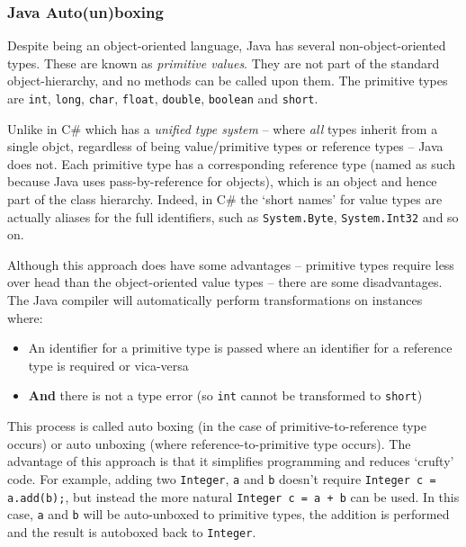 		\subsubsection{Java Auto(un)boxing} \label{sec:runtime/implementation/instrument/boxing}
		Despite being an object-oriented language, Java has several non-object-oriented types. These are known as \textit{primitive values}. They are not part of the standard object-hierarchy, and no methods can be called upon them. The primitive types are \texttt{int}, \texttt{long}, \texttt{char}, \texttt{float}, \texttt{double}, \texttt{boolean} and \texttt{short}.
		
		Unlike in C\# which has a \textit{unified type system} -- where \emph{all} types inherit from a single objct, regardless of being value/primitive types or reference types -- Java does not. Each primitive type has a corresponding reference type (named as such because Java uses pass-by-reference for objects), which is an object and hence part of the class hierarchy. Indeed, in C\# the `short names' for value types are actually aliases for the full identifiers, such as \texttt{System.Byte}, \texttt{System.Int32} and so on.
		
		Although this approach does have some advantages -- primitive types require less over head than the object-oriented value types -- there are some disadvantages. The Java compiler will automatically perform transformations on instances where:
		
		\begin{itemize}
			\item An identifier for a primitive type is passed where an identifier for a reference type is required or vica-versa
			\item \textbf{And} there is not a type error (so \texttt{int} cannot be transformed to \texttt{short})
		\end{itemize}
		
		This process is called auto boxing (in the case of primitive-to-reference type occurs) or auto unboxing (where reference-to-primitive type occurs). The advantage of this approach is that it simplifies programming and reduces `crufty' code. For example, adding two \texttt{Integer}, \texttt{a} and \texttt{b} doesn't require \texttt{Integer c = a.add(b);}, but instead the more natural \texttt{Integer c = a + b} can be used. In this case, \texttt{a} and \texttt{b} will be auto-unboxed to primitive types, the addition is performed and the result is autoboxed back to \texttt{Integer}.
		
